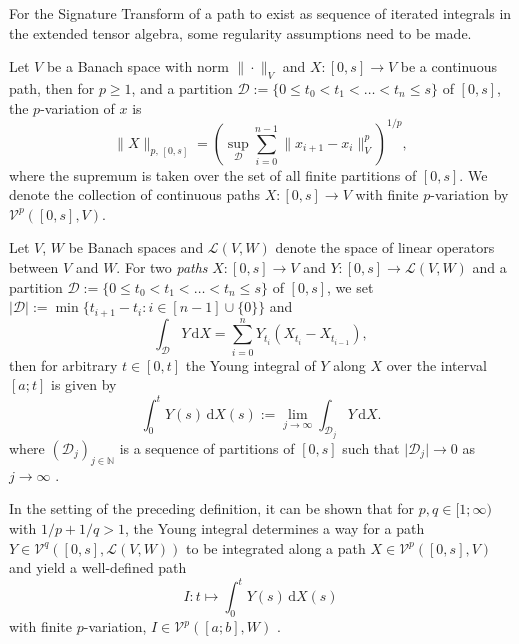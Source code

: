 \documentclass[openany]{book}
\begin{document}
For the Signature Transform of a path to exist as sequence of iterated integrals in the extended tensor algebra, some regularity assumptions need to be made.
\begin{definition}[$p$-variation]\label{p-var-def}
    Let $V$ be a Banach space with norm $\|\cdot \|_V$ and $X:[0,s]\to V$ be a continuous path, then for $p\geq 1$, and a partition $\mathcal D:=\{0\leq t_0< t_1<\dots<t_n\leq s \}$ of $[0,s]$, the $p$-variation of $x$ is 
    \begin{equation*}
        \|X\|_{p,\,[0,s]}=\left(\sup_{\mathcal D}\sum_{i=0}^{n -1} \|x_{i+1}-x_{i}\|_V^p\right)^{1/p},
    \end{equation*}
    where the supremum is taken over the set of all finite partitions of $[0,s]$. We denote the collection of continuous paths $X:[0,s]\to V$ with finite $p$-variation by $\mathscr V^{p}([0,s], V)$.
\end{definition}
\begin{definition}
    Let $V$, $W$ be Banach spaces and $\mathscr L(V,W)$ denote the space of linear operators between $V$ and $W$. For two \textit{paths} $X:[0,s]\to V$ and $Y:[0,s]\to \mathscr L(V,W)$ and a partition $\mathcal D:=\{0\leq t_0< t_1<\dots<t_n\leq s\}$ of $[0,s]$, we set $\vert \mathcal D\vert :=\min\{t_{i+1}-t_i:i\in [n-1]\cup \{0\}\}$ and
    \begin{equation*}
        \int _{\mathcal D}Y\,\mathrm dX=\sum_{i=0}^nY_{t_i}(X_{t_{i}}-X_{t_{i-1}}),
    \end{equation*}
    then for arbitrary $t\in [0,t]$ the Young integral of $Y$ along $X$ over the interval $[a;t]$ is given by
    \begin{equation*}
        \int_{0}^tY(s)\,\mathrm dX(s):=\lim_{j\to \infty}\int _{\mathcal D_j}Y\,\mathrm dX.
    \end{equation*}
    where $(\mathcal D_j)_{j\in \mathbb N}$ is a sequence of partitions of $[0,s]$ such that $\vert \mathcal D_j\vert \to 0$ as $j\to \infty$ \cite{lyons2022}.
\end{definition}
In the setting of the preceding definition, it can be shown that for $p,q\in [1;\infty)$ with  $1/p+1/q> 1$, the Young integral determines
a way for a path $Y\in \mathscr V^q([0,s], \mathscr L(V,W))$ to be integrated along a path $X\in \mathscr V^p([0,s], V)$ and yield a well-defined path 
\begin{equation*}
    I:t\mapsto \int_0^tY(s)\,\mathrm dX(s)
\end{equation*}
with finite $p$-variation, $I\in \mathscr V^p([a;b], W)$ \cite{lyons2007}.
\end{document}
